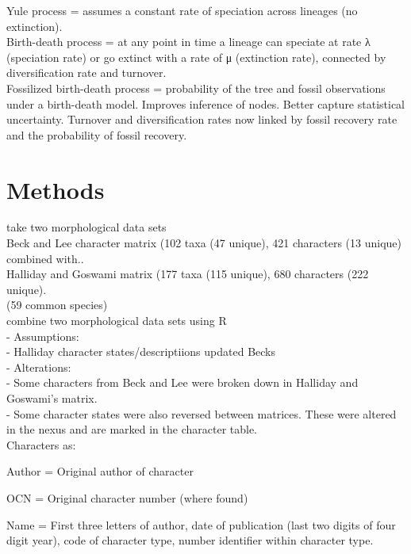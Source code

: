 \documentclass[a4paper,11pt]{article}
\begin{document}
Yule process = assumes a constant rate of speciation across lineages (no extinction).\\

Birth-death process = at any point in time a lineage can speciate at rate λ (speciation rate) or go extinct with a rate of μ (extinction rate), connected by diversification rate and turnover.\\

Fossilized birth-death process = probability of the tree and fossil observations under a birth-death model. Improves inference of nodes. Better capture statistical uncertainty. Turnover and diversification rates now linked by fossil recovery rate and the probability of fossil recovery.\\

\section{Methods}

take two morphological data sets \\

Beck and Lee character matrix \citep{beck2014ancient} (102 taxa (47 unique), 421 characters (13 unique) combined with..\\  

Halliday and Goswami matrix \citep{halliday2016eutherian} (177 taxa (115 unique), 680 characters (222 unique).\\ 

(59 common species)\\

combine two morphological data sets using R \\
 - Assumptions: \\ 
 - Halliday character states/descriptiions updated Becks\\ 

 - Alterations:\\
 - Some characters from Beck and Lee were broken down in Halliday and Goswami’s matrix. \\
 - Some character states were also reversed between matrices. These were altered in the nexus and are marked in the character table. \\
 
Characters as: 

Author = Original author of character

OCN = Original character number (where found)

Name = First three letters of author, date of publication (last two digits of four digit year), code of character type, number identifier within character type. \\ 
 
\end{document}
